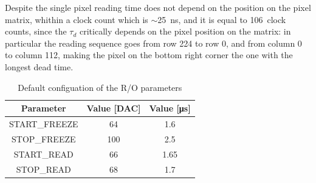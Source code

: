         Despite the single pixel reading time does not depend on the position on the pixel matrix, whithin a clock count which is $\sim$\SI{25}{ns}, and it is equal to \SI{106}{clock} counts, since the $\tau_d$ critically depends on the pixel position on the matrix: in particular the reading sequence goes from row 224 to row 0, and from column 0 to column 112, making the pixel on the bottom right corner the one with the longest dead time. 
       
        \begin{table}
            \begin{center}
            \begin{tabular}{|c | c | c |}
            \hline
            Parameter & Value [\si{DAC}] & Value [\si{\us}]\\
            \hline
            \hline
            START\_FREEZE & 64 & 1.6\\
            STOP\_FREEZE & 100 & 2.5\\
            START\_READ & 66 & 1.65\\
            STOP\_READ & 68 & 1.7\\
            \hline
            \end{tabular}
            \caption{Default configuation of the R/O parameters}
            \label{tab:R/O_param}
            \end{center}
        \end{table}
